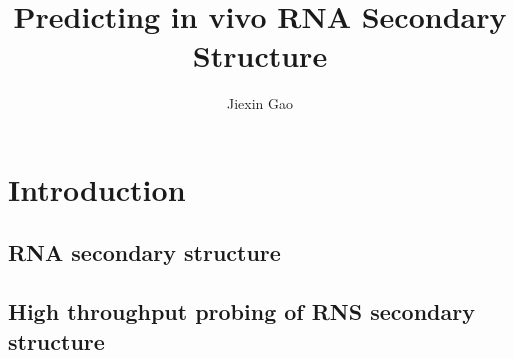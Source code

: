 \documentclass{proposal}
\author{Jiexin Gao}
\title{Predicting in vivo RNA Secondary Structure}
\begin{document}
\begin{preliminary}

\maketitle

\begin{abstract}



\end{abstract}

\tableofcontents

\end{preliminary}





\chapter{Introduction}

\section{RNA secondary structure}


%
%
%
%
%
%
%
%
%
%
%
%
%
%



\section{High throughput probing of RNS secondary structure}

%
%
%
%
%
%
%
\end{document}
